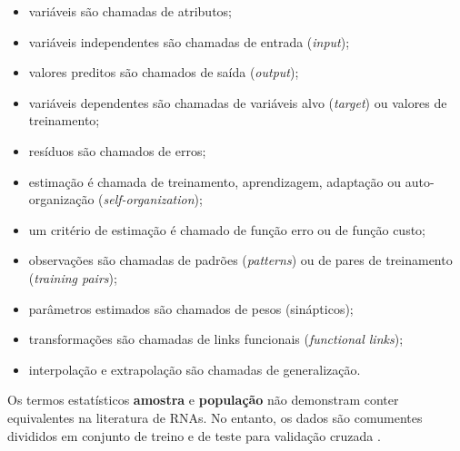 \documentclass{automatextcc}
\newcommand{\pumi}[1]{\textcolor{red}{#1}}
\begin{document}
\begin{itemize}
    \item variáveis são chamadas de atributos;
    \item variáveis independentes são chamadas de entrada (\textit{input});
    \item valores preditos são chamados de saída (\textit{output});
    \item variáveis dependentes são chamadas de variáveis alvo (\textit{target}) ou valores de treinamento;
    \item resíduos são chamados de erros;
    \item estimação é chamada de treinamento, aprendizagem, adaptação ou auto-organização (\textit{self-organization});
    \item um critério de estimação é chamado de função erro ou de função custo;
    \item observações são chamadas de padrões (\textit{patterns}) ou de pares de treinamento (\textit{training pairs});
    \item parâmetros estimados são chamados de pesos (sinápticos);
    \item transformações são chamadas de links funcionais (\textit{functional links});
    \item interpolação e extrapolação são chamadas de generalização.
\end{itemize}
Os termos estatísticos \textbf{amostra} e \textbf{população} não demonstram conter equivalentes na literatura de RNAs. No entanto, os dados são comumentes divididos em conjunto de treino e de teste para validação cruzada \citep{cheng1994}.
\end{document}
